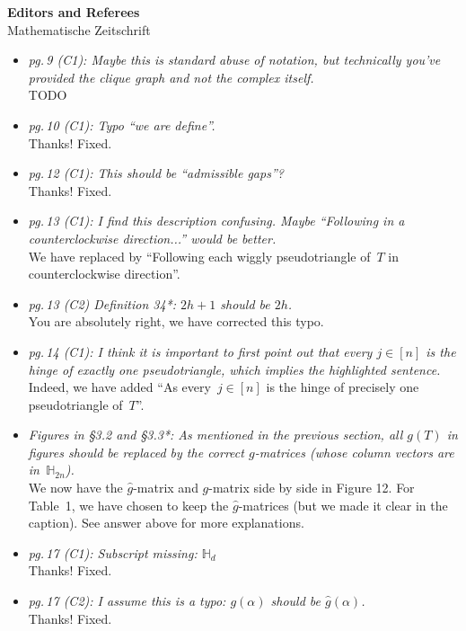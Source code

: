 \documentclass{letter}
\begin{document}
\begin{letter}{{\bf Editors and Referees} \\ Mathematische Zeitschrift}
\begin{itemize}
\item \textsl{\color{gray} pg.\,9 (C1): Maybe this is standard abuse of notation, but technically you’ve provided the clique graph and not the complex itself.} \\
TODO

\item \textsl{\color{gray} pg.\,10 (C1): Typo ``we are define''.} \\
Thanks! Fixed.

\item \textsl{\color{gray} pg.\,12 (C1): This should be ``admissible gaps''?} \\
Thanks! Fixed.

\item \textsl{\color{gray} pg.\,13 (C1): I find this description confusing. Maybe ``Following in a counterclockwise direction...'' would be better.} \\
We have replaced by ``Following each wiggly pseudotriangle of~$T$ in counterclockwise direction''.
\item \textsl{\color{gray} pg.\,13 (C2) Definition 34*: $2h + 1$ should be $2h$.} \\
You are absolutely right, we have corrected this typo.

\item \textsl{\color{gray} pg.\,14 (C1): I think it is important to first point out that every $j \in [n]$ is the hinge of exactly one pseudotriangle, which implies the highlighted sentence.} \\
Indeed, we have added ``As every~$j \in [n]$ is the hinge of precisely one pseudotriangle of~$T$''.

\item \textsl{\color{gray} Figures in §3.2 and §3.3*: As mentioned in the previous section, all $g(T)$ in figures should be replaced by the correct $g$-matrices (whose column vectors are in~$\mathbb{H}_{2n}$).} \\
We now have the $\hat{g}$-matrix and $g$-matrix side by side in Figure 12. For Table~1, we have chosen to keep the $\hat{g}$-matrices (but we made it clear in the caption). See answer above for more explanations.

\item \textsl{\color{gray} pg.\,17 (C1): Subscript missing: $\mathbb{H}_d$} \\
Thanks! Fixed.

\item \textsl{\color{gray} pg.\,17 (C2): I assume this is a typo: $g(\alpha)$ should be $\hat{g}(\alpha)$.} \\
Thanks! Fixed.


\end{itemize}
\end{letter}
\end{document}
